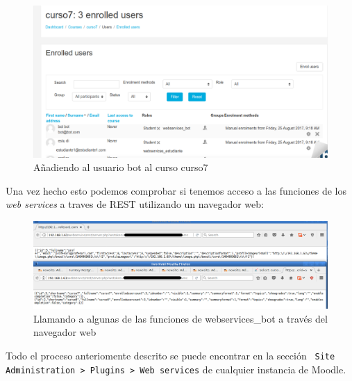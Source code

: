 \begin{enumerate}
\begin{figure}[H] %
\centering
\includegraphics[scale=0.3]{imagenes/moodle/Screenshot_2017-08-25_12-19-29.png}  %

\caption{Añadiendo al usuario bot al curso curso7 }\label{figura420}
\end{figure}
\end{enumerate}



Una vez hecho esto podemos comprobar si tenemos acceso a las funciones de los \textit{web services} a traves de REST utilizando un navegador web:
\begin{figure}[H] %
\centering
\includegraphics[scale=0.35]{imagenes/moodle/Screenshot_2017-08-25_12-32-18.png}  %

\caption{Llamando a algunas de las funciones de webservices\_bot a través del navegador web }\label{figura420}
\end{figure}

Todo el proceso anteriomente descrito se puede encontrar en la sección \texttt{ Site Administration > Plugins > Web services} de cualquier instancia de Moodle.

